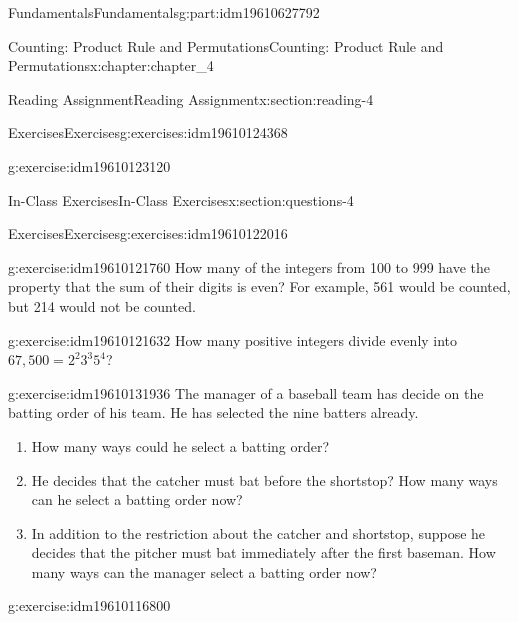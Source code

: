 \documentclass[oneside,10pt,]{book}
\numberwithin{equation}{section}
\begin{document}
\begin{partptx}{Fundamentals}{}{Fundamentals}{}{}{g:part:idm19610627792}
\begin{chapterptx}{Counting: Product Rule and Permutations}{}{Counting: Product Rule and Permutations}{}{}{x:chapter:chapter_4}
\begin{sectionptx}{Reading Assignment}{}{Reading Assignment}{}{}{x:section:reading-4}
\begin{exercises-subsection-numberless}{Exercises}{}{Exercises}{}{}{g:exercises:idm19610124368}
\begin{exercisegroup}
\begin{divisionexerciseeg}{2}{}{}{g:exercise:idm19610123120}
\end{divisionexerciseeg}%
\end{exercisegroup}
\par\medskip\noindent
\end{exercises-subsection-numberless}
\end{sectionptx}
%
%
\typeout{************************************************}
\typeout{************************************************}
%
\begin{sectionptx}{In-Class Exercises}{}{In-Class Exercises}{}{}{x:section:questions-4}
%
%
%
\typeout{************************************************}
\typeout{************************************************}
%
\begin{exercises-subsection-numberless}{Exercises}{}{Exercises}{}{}{g:exercises:idm19610122016}
\par\medskip\noindent%
%
\begin{exercisegroup}
\begin{divisionexerciseeg}{1}{}{}{g:exercise:idm19610121760}%
How many of the integers from 100 to 999 have the property that the sum of their digits is even? For example, 561 would be counted, but 214 would not be counted.%
\end{divisionexerciseeg}%
\begin{divisionexerciseeg}{2}{}{}{g:exercise:idm19610121632}%
How many positive integers divide evenly into \(67,500=2^2 3^3 5^4\)?%
\end{divisionexerciseeg}%
\begin{divisionexerciseeg}{3}{}{}{g:exercise:idm19610131936}%
The manager of a baseball team has decide on the batting order of his team.  He has selected the nine batters already.%
\begin{enumerate}[label=(\alph*)]
\item{}How many ways could he select a batting order?%
\item{}He decides that the catcher must bat before the shortstop?  How many ways can he select a batting order now?%
\item{}In addition to the restriction about the catcher and shortstop, suppose he decides that the pitcher must bat immediately after the first baseman.  How many ways can the manager select a batting order now?%
\end{enumerate}
%
\end{divisionexerciseeg}%
\begin{divisionexerciseeg}{4}{}{}{g:exercise:idm19610116800}%

\end{divisionexerciseeg}
\end{exercisegroup}
\end{exercises-subsection-numberless}
\end{sectionptx}
\end{chapterptx}
\end{partptx}
\end{document}

